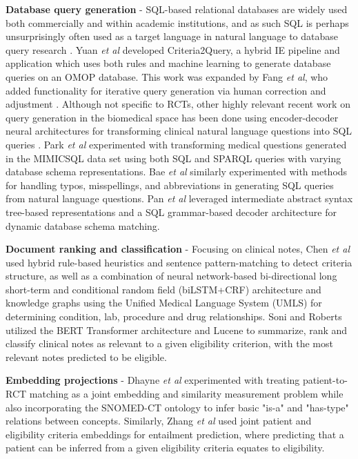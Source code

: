 \documentclass[../main.tex]{subfiles}
\begin{document}
\textbf{Database query generation} - SQL-based relational databases are widely used both commercially and within academic institutions, and as such SQL is perhaps unsurprisingly often used as a target language in natural language to database query research \cite{dar2019frameworks}. Yuan \textit{et al} developed Criteria2Query, a hybrid IE pipeline and application which uses both rules and machine learning to generate database queries on an OMOP database. This work was expanded by Fang \textit{et al}, who added functionality for iterative query generation via human correction and adjustment \cite{fang2022combining}. Although not specific to RCTs, other highly relevant recent work on query generation in the biomedical space has been done using encoder-decoder neural architectures for transforming clinical natural language questions into SQL queries \cite{bae2021question, park2021knowledge, wang2020text, pan2021bert, dhayne2021emr2vec}. Park \textit{et al} \cite{park2021knowledge} experimented with transforming medical questions generated in the MIMICSQL data set \cite{johnson2016mimic, wang2020text} using both SQL and SPARQL queries with varying database schema representations. Bae \textit{et al} similarly experimented with methods for handling typos, misspellings, and abbreviations in generating SQL queries from natural language questions. Pan \textit{et al} \cite{pan2021bert} leveraged intermediate abstract syntax tree-based representations and a SQL grammar-based decoder architecture for dynamic database schema matching. 

\textbf{Document ranking and classification} - Focusing on clinical notes, Chen \textit{et al} \cite{chen2019clinical} used hybrid rule-based heuristics and sentence pattern-matching to detect criteria structure, as well as a combination of neural network-based bi-directional long short-term and conditional random field (biLSTM+CRF) architecture and knowledge graphs using the Unified Medical Language System (UMLS) for determining condition, lab, procedure and drug relationships. Soni and Roberts \cite{soni2020patient} utilized the BERT Transformer architecture \cite{devlin2018bert} and Lucene \cite{lucene} to summarize, rank and classify clinical notes as relevant to a given eligibility criterion, with the most relevant notes predicted to be eligible. 

\textbf{Embedding projections} - Dhayne \textit{et al} \cite{dhayne2021emr2vec} experimented with treating patient-to-RCT matching as a joint embedding and similarity measurement problem while also incorporating the SNOMED-CT ontology to infer basic "is-a" and "has-type" relations between concepts. Similarly, Zhang \textit{et al} \cite{zhang2020deepenroll} used joint patient and eligibility criteria embeddings for entailment prediction, where predicting that a patient can be inferred from a given eligibility criteria equates to eligibility. 
\end{document}
